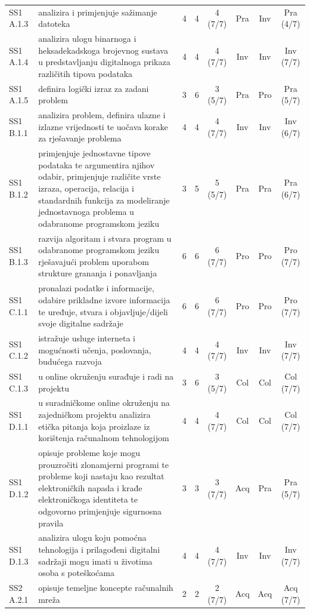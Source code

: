\documentclass[journal,article,submit,pdftex,moreauthors]{Definitions/mdpi}
\begin{document}
{\begin{longtable}{p{1.35cm}p{6.6cm}cccccc}
SS1 A.1.3 & analizira i primjenjuje sažimanje datoteka & 4 & 4 & 4 (7/7) & Pra & Inv & Pra (4/7) \\
SS1 A.1.4 & analizira ulogu binarnoga i heksadekadskoga brojevnog sustava u predstavljanju digitalnoga prikaza različitih tipova podataka & 4 & 4 & 4 (7/7) & Inv & Inv & Inv (7/7) \\
SS1 A.1.5 & definira logički izraz za zadani problem & 3 & 6 & 3 (5/7) & Pra & Pro & Pra (5/7) \\
SS1 B.1.1 & analizira problem, definira ulazne i izlazne vrijednosti te uočava korake za rješavanje problema & 4 & 4 & 4 (7/7) & Inv & Inv & Inv (6/7) \\
SS1 B.1.2 & primjenjuje jednostavne tipove podataka te argumentira njihov odabir, primjenjuje različite vrste izraza, operacija, relacija i standardnih funkcija za modeliranje jednostavnoga problema u odabranome programskom jeziku & 3 & 5 & 5 (5/7) & Pra & Pra & Pra (6/7) \\
SS1 B.1.3 & razvija algoritam i stvara program u odabranome programskom jeziku rješavajući problem uporabom strukture grananja i ponavljanja & 6 & 6 & 6 (7/7) & Pro & Pro & Pro (7/7) \\
SS1 C.1.1 & pronalazi podatke i informacije, odabire prikladne izvore informacija te uređuje, stvara i objavljuje/dijeli svoje digitalne sadržaje & 6 & 6 & 6 (7/7) & Pro & Pro & Pro (7/7) \\
SS1 C.1.2 & istražuje usluge interneta i mogućnosti učenja, poslovanja, budućega razvoja & 4 & 4 & 4 (7/7) & Inv & Inv & Inv (7/7) \\
SS1 C.1.3 & u online okruženju surađuje i radi na projektu & 3 & 6 & 3 (5/7) & Col & Col & Col (7/7) \\
SS1 D.1.1 & u suradničkome online okruženju na zajedničkom projektu analizira etička pitanja koja proizlaze iz korištenja računalnom tehnologijom & 4 & 4 & 4 (7/7) & Col & Col & Col (7/7) \\
SS1 D.1.2 & opisuje probleme koje mogu prouzročiti zlonamjerni programi te probleme koji nastaju kao rezultat elektroničkih napada i krađe elektroničkoga identiteta te odgovorno primjenjuje sigurnosna pravila & 3 & 3 & 3 (7/7) & Acq & Pra & Pra (5/7) \\
SS1 D.1.3 & analizira ulogu koju pomoćna tehnologija i prilagođeni digitalni sadržaji mogu imati u životima osoba s poteškoćama & 4 & 4 & 4 (7/7) & Inv & Inv & Inv (7/7) \\
SS2 A.2.1 & opisuje temeljne koncepte računalnih mreža & 2 & 2 & 2 (7/7) & Acq & Acq & Acq (7/7) \\

\end{longtable}}
\end{document}
